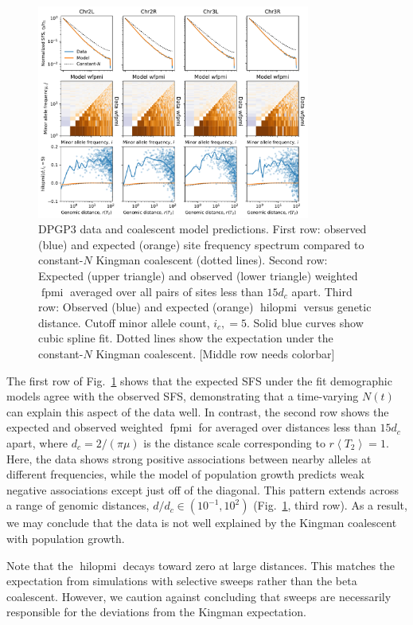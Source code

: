 \documentclass[11pt, letterpaper]{article}   	%
\newcommand{\fig}[1]{Fig.~\ref{#1}}
\newcommand{\E}[1]{\left< #1 \right>}
\DeclareMathOperator{\fpmi}{fpmi}
\DeclareMathOperator{\hilopmi}{hilopmi}
\begin{document}
\begin{figure}
\centering
\includegraphics[width=0.8\textwidth]{figures/figure6.pdf}
\caption{DPGP3 data and coalescent model predictions. First row: observed (blue) and expected (orange) site frequency spectrum compared to constant-$N$ Kingman coalescent (dotted lines). Second row: Expected (upper triangle) and observed (lower triangle) weighted $\fpmi$ averaged over all pairs of sites less than $15 d_c$ apart. Third row: Observed (blue) and expected (orange) $\hilopmi$ versus genetic distance. Cutoff minor allele count, $i_c, = 5$. Solid blue curves show cubic spline fit. Dotted lines show the expectation under the constant-$N$ Kingman coalescent. [Middle row needs colorbar] \label{fig:dpgp3}}
\end{figure}

The first row of \fig{fig:dpgp3} shows that the expected SFS under the fit demographic models agree with the observed SFS, demonstrating that a time-varying $N(t)$ can explain this aspect of the data well.
In contrast, the second row shows the expected and observed weighted $\fpmi$ for averaged over distances less than $15 d_c$ apart, where $d_c = 2/ (\pi \mu)$ is the distance scale corresponding to $r\E{T_2} = 1$.
Here, the data shows strong positive associations between nearby alleles at different frequencies, while the model of population growth predicts weak negative associations except just off of the diagonal.
This pattern extends across a range of genomic distances, $d/d_c \in (10^{-1}, 10^2)$ (\fig{fig:dpgp3}, third row).
As a result, we may conclude that the data is not well explained by the Kingman coalescent with population growth.

Note that the $\hilopmi$ decays toward zero at large distances.
This matches the expectation from simulations with selective sweeps rather than the beta coalescent.
However, we caution against concluding that sweeps are necessarily responsible for the deviations from the Kingman expectation.
\end{document}

